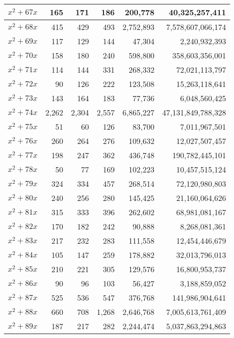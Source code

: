 \documentclass[a4paper]{amsproc}
\theoremstyle{plain}
\begin{document}
\begin{longtable}{ | l | r | r | r | r | r | }
$x^2 + 67x$ & 165 & 171 & 186 & 200{,}778 & 40{,}325{,}257{,}411 \\ \hline
$x^2 + 68x$ & 415 & 429 & 493 & 2{,}752{,}893 & 7{,}578{,}607{,}066{,}174 \\ \hline
$x^2 + 69x$ & 117 & 129 & 144 & 47{,}304 & 2{,}240{,}932{,}393 \\ \hline
$x^2 + 70x$ & 158 & 180 & 240 & 598{,}800 & 358{,}603{,}356{,}001 \\ \hline
$x^2 + 71x$ & 114 & 144 & 331 & 268{,}332 & 72{,}021{,}113{,}797 \\ \hline
$x^2 + 72x$ & 90 & 126 & 222 & 123{,}508 & 15{,}263{,}118{,}641 \\ \hline
$x^2 + 73x$ & 143 & 164 & 183 & 77{,}736 & 6{,}048{,}560{,}425 \\ \hline
$x^2 + 74x$ & 2{,}262 & 2{,}304 & 2{,}557 & 6{,}865{,}227 & 47{,}131{,}849{,}788{,}328 \\ \hline
$x^2 + 75x$ & 51 & 60 & 126 & 83{,}700 & 7{,}011{,}967{,}501 \\ \hline
$x^2 + 76x$ & 260 & 264 & 276 & 109{,}632 & 12{,}027{,}507{,}457 \\ \hline
$x^2 + 77x$ & 198 & 247 & 362 & 436{,}748 & 190{,}782{,}445{,}101 \\ \hline
$x^2 + 78x$ & 50 & 77 & 169 & 102{,}223 & 10{,}457{,}515{,}124 \\ \hline
$x^2 + 79x$ & 324 & 334 & 457 & 268{,}514 & 72{,}120{,}980{,}803 \\ \hline
$x^2 + 80x$ & 240 & 256 & 280 & 145{,}425 & 21{,}160{,}064{,}626 \\ \hline
$x^2 + 81x$ & 315 & 333 & 396 & 262{,}602 & 68{,}981{,}081{,}167 \\ \hline
$x^2 + 82x$ & 170 & 182 & 242 & 90{,}888 & 8{,}268{,}081{,}361 \\ \hline
$x^2 + 83x$ & 217 & 232 & 283 & 111{,}558 & 12{,}454{,}446{,}679 \\ \hline
$x^2 + 84x$ & 105 & 147 & 259 & 178{,}882 & 32{,}013{,}796{,}013 \\ \hline
$x^2 + 85x$ & 210 & 221 & 305 & 129{,}576 & 16{,}800{,}953{,}737 \\ \hline
$x^2 + 86x$ & 90 & 96 & 103 & 56{,}427 & 3{,}188{,}859{,}052 \\ \hline
$x^2 + 87x$ & 525 & 536 & 547 & 376{,}768 & 141{,}986{,}904{,}641 \\ \hline
$x^2 + 88x$ & 660 & 708 & 1{,}268 & 2{,}646{,}768 & 7{,}005{,}613{,}761{,}409 \\ \hline
$x^2 + 89x$ & 187 & 217 & 282 & 2{,}244{,}474 & 5{,}037{,}863{,}294{,}863 \\ \hline

\end{longtable}
\end{document}
